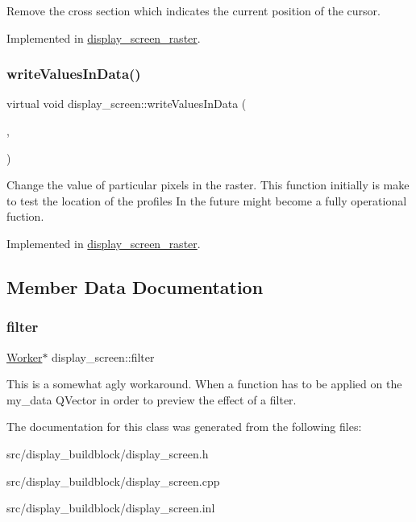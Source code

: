 Remove the cross section which indicates the current position of the cursor. 

Implemented in \mbox{\hyperlink{classdisplay__screen__raster_a0469e5189411a5b83d6386510832d46d}{display\+\_\+screen\+\_\+raster}}.

\mbox{\label{classdisplay__screen_a2788f315d8f91b4c8a2b870698ce6623}} 
\subsubsection{\texorpdfstring{write\+Values\+In\+Data()}{writeValuesInData()}}
{\footnotesize\ttfamily virtual void display\+\_\+screen\+::write\+Values\+In\+Data (\begin{DoxyParamCaption}\item[{const stir\+::\+Proj\+Matrix\+Elems\+For\+One\+Bin \&}]{,  }\item[{const float \&}]{ }\end{DoxyParamCaption})\hspace{0.3cm}{\ttfamily [pure virtual]}}

Change the value of particular pixels in the raster. This function initially is make to test the location of the profiles In the future might become a fully operational fuction. 

Implemented in \mbox{\hyperlink{classdisplay__screen__raster_a7cfddde7af1d6bb730a43b5cd13af34f}{display\+\_\+screen\+\_\+raster}}.



\subsection{Member Data Documentation}
\mbox{\label{classdisplay__screen_a54ed0638f240e4a044d9d4376233ec71}} 
\subsubsection{\texorpdfstring{filter}{filter}}
{\footnotesize\ttfamily \mbox{\hyperlink{classWorker}{Worker}}$\ast$ display\+\_\+screen\+::filter\hspace{0.3cm}{\ttfamily [protected]}}

This is a somewhat agly workaround. When a function has to be applied on the my\+\_\+data Q\+Vector in order to preview the effect of a filter. 

The documentation for this class was generated from the following files\+:\begin{DoxyCompactItemize}
\item 
src/display\+\_\+buildblock/display\+\_\+screen.\+h\item 
src/display\+\_\+buildblock/display\+\_\+screen.\+cpp\item 
src/display\+\_\+buildblock/display\+\_\+screen.\+inl\end{DoxyCompactItemize}
